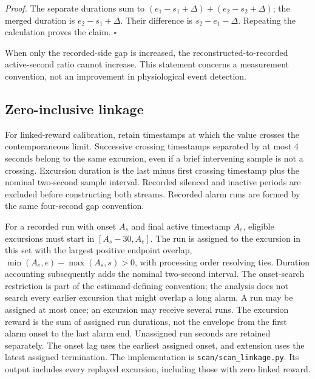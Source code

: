 \documentclass[11pt,letterpaper]{article}
\begin{document}
\emph{Proof.} The separate durations sum to $(e_1-s_1+\Delta)+(e_2-s_2+\Delta)$; the merged duration is $e_2-s_1+\Delta$. Their difference is $s_2-e_1-\Delta$. Repeating the calculation proves the claim. $\square$

When only the recorded-side gap is increased, the reconstructed-to-recorded active-second ratio cannot increase. This statement concerns a measurement convention, not an improvement in physiological event detection.


\subsection{Zero-inclusive linkage}\label{s:linkdef}
For linked-reward calibration, retain timestamps at which the value crosses the contemporaneous limit. Successive crossing timestamps separated by at most 4 seconds belong to the same excursion, even if a brief intervening sample is not a crossing. Excursion duration is the last minus first crossing timestamp plus the nominal two-second sample interval. Recorded silenced and inactive periods are excluded before constructing both streams. Recorded alarm runs are formed by the same four-second gap convention.

For a recorded run with onset $A_s$ and final active timestamp $A_e$, eligible excursions must start in $[A_s-30,A_e]$. The run is assigned to the excursion in this set with the largest positive endpoint overlap, $\min(A_e,e)-\max(A_s,s)>0$, with processing order resolving ties. Duration accounting subsequently adds the nominal two-second interval. The onset-search restriction is part of the estimand-defining convention; the analysis does not search every earlier excursion that might overlap a long alarm. A run may be assigned at most once; an excursion may receive several runs. The excursion reward is the sum of assigned run durations, not the envelope from the first alarm onset to the last alarm end. Unassigned run seconds are retained separately. The onset lag uses the earliest assigned onset, and extension uses the latest assigned termination. The implementation is \texttt{scan/scan\_linkage.py}. Its output includes every replayed excursion, including those with zero linked reward.
\end{document}
